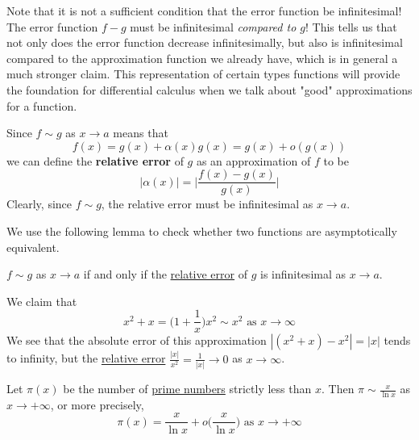   Note that it is not a sufficient condition that the error function be infinitesimal! The error function $f-g$ must be infinitesimal \textit{compared to $g$}! This tells us that not only does the error function decrease infinitesimally, but also is infinitesimal compared to the approximation function we already have, which is in general a much stronger claim. This representation of certain types functions will provide the foundation for differential calculus when we talk about "good" approximations for a function. 


  \begin{definition}
    \label{def:relative-error}
    Since $f \sim g$ as $x \to a$ means that 
    \begin{equation}
      f(x) = g(x) + \alpha(x) g(x) = g(x) + o(g(x))
    \end{equation}
    we can define the \textbf{relative error} of $g$ as an approximation of $f$ to be
    \begin{equation}
      |\alpha(x)| = \bigg| \frac{f(x) - g(x)}{g(x)} \bigg|
    \end{equation}
    Clearly, since $f \sim g$, the relative error must be infinitesimal as $x \to a$. 
  \end{definition}

  We use the following lemma to check whether two functions are asymptotically equivalent. 
  \begin{lemma}
    \label{thm:asymptotic-equivalence-via-relative-error}
    $f \sim g$ as $x \to a$ if and only if the \hyperref[def:relative-error]{relative error} of $g$ is infinitesimal as $x \to a$. 
  \end{lemma}

  \begin{example}
    \label{ex:asymptotic-equivalence-of-x2x-and-x2}
    We claim that 
    \begin{equation}
      x^2 + x = \bigg(1 + \frac{1}{x} \bigg) x^2 \sim x^2 \text{ as } x \to \infty
    \end{equation}
    We see that the absolute error of this approximation $|(x^2 + x) - x^2| = |x|$ tends to infinity, but the \hyperref[def:relative-error]{relative error} $\frac{|x|}{x^2} = \frac{1}{|x|} \to 0$ as $x \to \infty$. 
  \end{example}

  \begin{theorem}
    \label{thm:prime-number-theorem}
    Let $\pi(x)$ be the number of \hyperref[thm:prime-number-theorem]{prime numbers} strictly less than $x$. Then $\pi \sim \frac{x}{\ln{x}}$ as $x\to + \infty$, or more precisely, 
    \begin{equation}
      \pi(x) = \frac{x}{\ln{x}} + o \bigg( \frac{x}{\ln{x}}\bigg) \text{ as } x \to +\infty
    \end{equation}
  \end{theorem}

